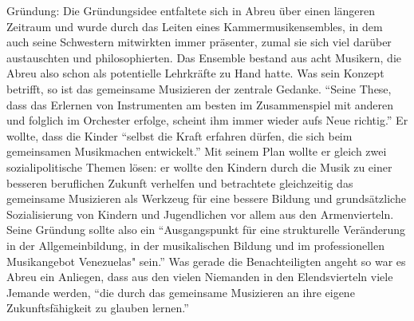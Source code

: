 Gründung: Die Gründungsidee entfaltete sich in Abreu über einen längeren
Zeitraum und wurde durch das Leiten eines Kammermusikensembles, in dem auch
seine Schwestern mitwirkten immer präsenter, zumal sie sich viel darüber
austauschten und philosophierten. Das Ensemble bestand aus acht Musikern, die
Abreu also schon als potentielle Lehrkräfte zu Hand hatte.
\autocite[34]{kaufmann:el_sistema} Was sein Konzept betrifft, so ist das
gemeinsame Musizieren der zentrale Gedanke. \enquote{Seine These, dass das
Erlernen von Instrumenten am besten im Zusammenspiel mit anderen und folglich im
Orchester erfolge, scheint ihm immer wieder aufs Neue
richtig.}\autocite[34]{kaufmann:el_sistema} Er wollte, dass die Kinder
\enquote{selbst die Kraft erfahren dürfen, die sich beim gemeinsamen Musikmachen
entwickelt.}\autocite[34]{kaufmann:el_sistema} Mit seinem Plan wollte er gleich
zwei sozialipolitische Themen lösen: er wollte den Kindern durch die Musik zu
einer besseren beruflichen Zukunft verhelfen und betrachtete gleichzeitig das
gemeinsame Musizieren als Werkzeug für eine bessere Bildung und grundsätzliche
Sozialisierung von Kindern und Jugendlichen vor allem aus den Armenvierteln.
Seine Gründung sollte also ein \enquote{Ausgangspunkt für eine strukturelle
Veränderung in der Allgemeinbildung, in der musikalischen Bildung und im
professionellen Musikangebot Venezuelas"
sein.}\autocite[38]{kaufmann:el_sistema} Was gerade die Benachteiligten angeht
so war es Abreu ein Anliegen, dass aus den vielen Niemanden in den
Elendsvierteln viele Jemande werden, \enquote{die durch das gemeinsame
Musizieren an ihre eigene Zukunftsfähigkeit zu glauben
lernen.}\autocite[39]{kaufmann:el_sistema}

